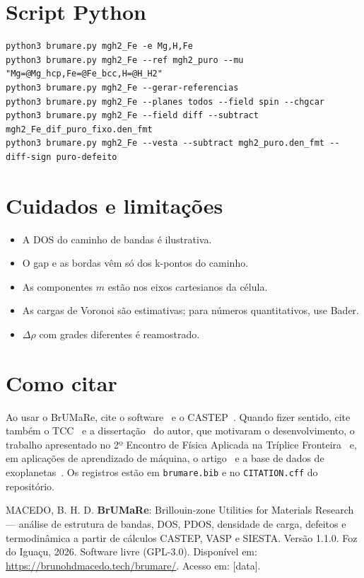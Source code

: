 \documentclass[11pt,a4paper]{article}
\newcommand{\cp}{\textsf{BrUMa\textcolor[HTML]{B26B00}{Re}}}
\begin{document}
\section{Script Python}
\begin{lstlisting}
python3 brumare.py mgh2_Fe -e Mg,H,Fe
python3 brumare.py mgh2_Fe --ref mgh2_puro --mu "Mg=@Mg_hcp,Fe=@Fe_bcc,H=@H_H2"
python3 brumare.py mgh2_Fe --gerar-referencias
python3 brumare.py mgh2_Fe --planes todos --field spin --chgcar
python3 brumare.py mgh2_Fe --field diff --subtract mgh2_Fe_dif_puro_fixo.den_fmt
python3 brumare.py mgh2_Fe --vesta --subtract mgh2_puro.den_fmt --diff-sign puro-defeito
\end{lstlisting}

\section{Cuidados e limitações}
\begin{itemize}
  \item A DOS do caminho de bandas é ilustrativa.
  \item O gap e as bordas vêm só dos k-pontos do caminho.
  \item As componentes $m$ estão nos eixos cartesianos da célula.
  \item As cargas de Voronoi são estimativas; para números quantitativos, use Bader.
  \item $\Delta\rho$ com grades diferentes é reamostrado.
\end{itemize}

\section{Como citar}
Ao usar o \cp, cite o software~\cite{macedo2026brumare} e o CASTEP~\cite{clark2005castep}. Quando fizer sentido, cite também o TCC~\cite{macedo2025tcc} e a dissertação~\cite{macedo2027dissertacao} do autor, que motivaram o desenvolvimento, o trabalho apresentado no 2º Encontro de Física Aplicada na Tríplice Fronteira~\cite{macedo2025efatf} e, em aplicações de aprendizado de máquina, o artigo~\cite{macedo2024rbic} e a base de dados de exoplanetas~\cite{macedo2024dataset}. Os registros estão em \texttt{brumare.bib} e no \texttt{CITATION.cff} do repositório.

\begin{nota}[title={Referência sugerida (ABNT)}]
MACEDO, B. H. D. \textbf{BrUMaRe}: Brillouin-zone Utilities for Materials Research --- análise de estrutura de bandas, DOS, PDOS, densidade de carga, defeitos e termodinâmica a partir de cálculos CASTEP, VASP e SIESTA. Versão 1.1.0. Foz do Iguaçu, 2026. Software livre (GPL-3.0). Disponível em: \url{https://brunohdmacedo.tech/brumare/}. Acesso em: [data].
\end{nota}
\end{document}
